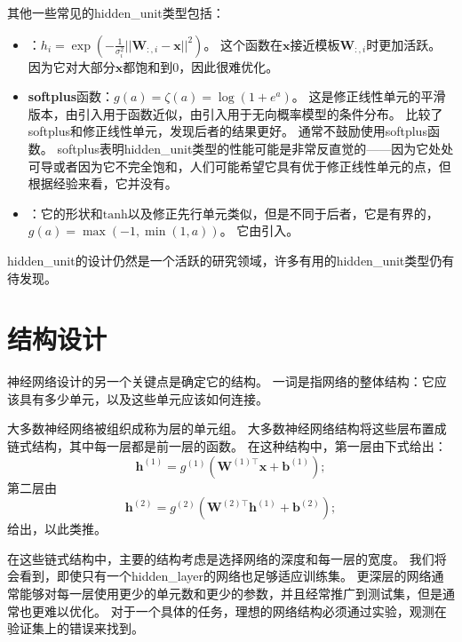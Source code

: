 其他一些常见的\gls{hidden_unit}类型包括：
\begin{itemize}
\item {}：$h_i = \exp \left (-\frac{1}{\sigma_i^2}|| \bm{W}_{:,i}-\bm{x}||^2 \right )$。
这个函数在$\bm{x}$接近模板$\bm{W}_{:,i}$时更加活跃。
因为它对大部分$\bm{x}$都饱和到0，因此很难优化。

\item \textbf{\gls{softplus}}函数：$g(a)=\zeta(a)=\log(1+e^a)$。
这是修正线性单元的平滑版本，由\cite{Dugas01}引入用于函数近似，由\cite{Nair-2010-small}引入用于无向概率模型的条件分布。
\cite{Glorot+al-AI-2011-small}比较了softplus和修正线性单元，发现后者的结果更好。
通常不鼓励使用softplus函数。
softplus表明\gls{hidden_unit}类型的性能可能是非常反直觉的——因为它处处可导或者因为它不完全饱和，人们可能希望它具有优于修正线性单元的点，但根据经验来看，它并没有。

\item {}：它的形状和$\text{tanh}$以及修正先行单元类似，但是不同于后者，它是有界的，$g(a)=\max(-1, \min(1,a))$。
它由\cite{Collobert04}引入。
\end{itemize}

\gls{hidden_unit}的设计仍然是一个活跃的研究领域，许多有用的\gls{hidden_unit}类型仍有待发现。

\section{结构设计}
\label{sec:architecture_design}

神经网络设计的另一个关键点是确定它的结构。
一词是指网络的整体结构：它应该具有多少单元，以及这些单元应该如何连接。


大多数神经网络被组织成称为层的单元组。
大多数神经网络结构将这些层布置成链式结构，其中每一层都是前一层的函数。
在这种结构中，第一层由下式给出：
\begin{equation}
\bm{h}^{(1)}= g^{(1)}\left ( \bm{W}^{(1)\top} \bm{x} + \bm{b}^{(1)}\right );
\end{equation}
第二层由
\begin{equation}
\bm{h}^{(2)} = g^{(2)}\left ( \bm{W}^{(2)\top}\bm{h}^{(1)}+\bm{b}^{(2)} \right );
\end{equation}
给出，以此类推。

在这些链式结构中，主要的结构考虑是选择网络的深度和每一层的宽度。
我们将会看到，即使只有一个\gls{hidden_layer}的网络也足够适应训练集。
更深层的网络通常能够对每一层使用更少的单元数和更少的参数，并且经常推广到测试集，但是通常也更难以优化。
对于一个具体的任务，理想的网络结构必须通过实验，观测在验证集上的错误来找到。

